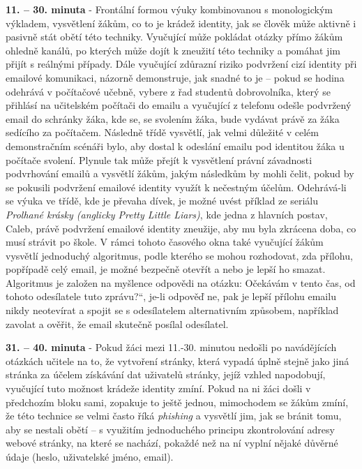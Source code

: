 \documentclass[a4paper, 12pt]{article}
\providecommand{\uv}[1]{\quotedblbase #1\textquotedblleft}
\begin{document}
\textbf{11. -- 30. minuta} - Frontální formou výuky kombinovanou s monologickým výkladem, vysvětlení žákům, co to je krádež identity, jak se člověk může aktivně i pasivně stát obětí této techniky. Vyučující může pokládat otázky přímo žákům ohledně kanálů, po kterých může dojít k zneužití této techniky a pomáhat jim přijít s reálnými případy. Dále vyučující zdůrazní riziko podvržení cizí identity při emailové komunikaci, názorně demonstruje, jak snadné to je -- pokud se hodina odehrává v počítačové učebně, vybere z řad studentů dobrovolníka, který se přihlásí na učitelském počítači do emailu a vyučující z telefonu odešle podvržený email do schránky žáka, kde se, se svolením žáka, bude vydávat právě za žáka sedícího za počítačem. Následně třídě vysvětlí, jak velmi důležité v celém demonstračním scénáři bylo, aby dostal k odeslání emailu pod identitou žáka u počítače svolení. Plynule tak může přejít k vysvětlení právní závadnosti podvrhování emailů a vysvětlí žákům, jakým následkům by mohli čelit, pokud by se pokusili podvržení emailové identity využít k nečestným účelům. Odehrává-li se výuka ve třídě, kde je převaha dívek, je možné uvést příklad ze seriálu \textit{Prolhané krásky (anglicky Pretty Little Liars)}, kde jedna z hlavních postav, Caleb, právě podvržení emailové identity zneužije, aby mu byla zkrácena doba, co musí strávit po škole. V rámci tohoto časového okna také vyučující žákům vysvětlí jednoduchý algoritmus, podle kterého se mohou rozhodovat, zda přílohu, popřípadě celý email, je možné bezpečně otevřít a nebo je lepší ho smazat. Algoritmus je založen na myšlence odpovědi na otázku: \uv{Očekávám v tento čas, od tohoto odesílatele tuto zprávu?}, je-li odpověď ne, pak je lepší přílohu emailu nikdy neotevírat a spojit se s odesílatelem alternativním způsobem, například zavolat a ověřit, že email skutečně posílal odesílatel.

\textbf{31. -- 40. minuta} - Pokud žáci mezi 11.-30. minutou nedošli po navádějících otázkách učitele na to, že vytvoření stránky, která vypadá úplně stejně jako jiná stránka za účelem získávání dat uživatelů stránky, jejíž vzhled napodobují, vyučující tuto možnost krádeže identity zmíní. Pokud na ni žáci došli v předchozím bloku sami, zopakuje to ještě jednou, mimochodem se žákům zmíní, že této technice se velmi často říká \textit{phishing} a vysvětlí jim, jak se bránit tomu, aby se nestali obětí -- s využitím jednoduchého principu zkontrolování adresy webové stránky, na které se nachází, pokaždé než na ní vyplní nějaké důvěrné údaje (heslo, uživatelské jméno, email).
\end{document}
